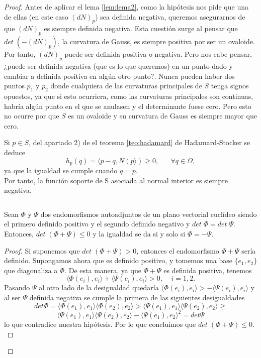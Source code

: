 \begin{proof}
	Antes de aplicar el lema \ref{lem:lema2}, como la hipótesis nos pide que una de ellas (en este caso $(dN)_p$) sea definida negativa, queremos asegurarnos de que $(dN)_p$ es siempre definida negativa. Esta cuestión surge al pensar que $det \; (-(dN)_p)$, la curvatura de Gauss, es siempre positiva por ser un ovaloide. Por tanto, $(dN)_p$ puede ser definida positiva o negativa. Pero nos cabe pensar, ¿puede ser definida negativa (que es lo que queremos) en un punto dado y cambiar a definida positiva en algún otro punto?. Nunca pueden haber dos puntos $p_1$ y $p_2$ donde cualquiera de las curvaturas principales de $S$ tenga signos opuestos, ya que si esto ocurriera, como las curvaturas principales son continuas, habría algún punto en el que se anulasen y el determinante fuese cero. Pero esto no ocurre por que $S$ es un ovaloide y su curvatura de Gauss es siempre mayor que cero.
	${ }$\\
	
	\begin{observacion}
		Si $p \in S$, del apartado 2) de el teorema \ref{teo:hadamard} de Hadamard-Stocker se deduce
		\[
			h_p (q) = \langle p - q, N(p \rangle) \geq 0, \;\;\;\;\;\; \forall q \in \Omega,
		\]
		ya que la igualdad se cumple cuando $q = p$.
		${ }$\\
		
		Por tanto, la función soporte de S asociada al normal interior es siempre negativa.
	\end{observacion}
	${ }$\\
	
	\begin{lema} \label{lem:lema2}
		Sean $\Phi$ y $\Psi$ dos endomorfismos autoadjuntos de un plano vectorial euclídeo siendo el primero definido positivo y el segundo definido negativo y $det \; \Phi = det \; \Psi$. Entonces, $det \; (\Phi + \Psi) \leq 0$ y la igualdad se da si y solo si $\Phi = - \Psi$.
	\end{lema}
	\begin{proof}
		Si suponemos que $det \; (\Phi + \Psi) > 0$, entonces el endomorfismo $\Phi + \Psi$ sería definido. Supongamos ahora que es definido positivo, y tomemos una base $\{ e_1, e_2 \}$ que diagonaliza a $\Phi$. De esta manera, ya que $\Phi + \Psi$ es definida positiva, tenemos
		${ }$\\
		\[
				\langle \Phi(e_i), e_i \rangle + \langle \Psi(e_i), e_i \rangle > 0, \;\;\;\; i = 1, 2.
		\]
		${ }$\\
		
		Pasando $\Psi$ al otro lado de la desigualdad quedaría $\langle \Phi(e_i), e_i \rangle  > -\langle \Psi(e_i), e_i \rangle$ y al ser $\Psi$ definida negativa se cumple la primera de las siguientes desigualdades
		${ }$\\
		$$
			det \Phi = \langle \Phi(e_1), e_1 \rangle \langle \Phi(e_2), e_2 \rangle > \langle \Psi(e_1), e_1 \rangle \langle \Psi(e_2), e_2 \rangle \geq $$
			$$ \langle \Psi(e_1), e_1 \rangle \langle \Psi(e_2), e_2 \rangle - \langle \Psi(e_1), e_2 \rangle^2 = det \Psi
		$$
		${ }$\\
		lo que contradice nuestra hipótesis. Por lo que concluimos que $ det \; (\Phi + \Psi) \leq 0$.
		${ }$\\
		

\end{proof}
\end{proof}
